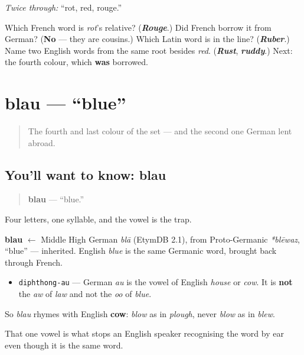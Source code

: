 \emph{Twice through:} \textquotedblleft{}rot, red, rouge.\textquotedblright{}

\begin{tcolorbox}[breakable,colback=teal!4,colframe=teal!35!black,title={Before you move on}]
Which French word is \emph{rot}'s relative? (\emph{\textbf{Rouge}}.) Did French borrow it from German? (\textbf{No} — they are cousins.) Which Latin word is in the line? (\emph{\textbf{Ruber}}.) Name two English words from the same root besides \emph{red}. (\emph{\textbf{Rust}}, \emph{\textbf{ruddy}}.) Next: the fourth colour, which \textbf{was} borrowed.
\end{tcolorbox}
\section[blau]{blau — \textquotedblleft{}blue\textquotedblright{}}

\label{lesson:GE-C13-blau}



\begin{quote}
The fourth and last colour of the set — and the second one German lent abroad.
\end{quote}

\subsection*{You'll want to know: blau}
\begin{quote}
\textbf{blau} — \textquotedblleft{}blue.\textquotedblright{}
\end{quote}

Four letters, one syllable, and the vowel is the trap.

\begin{cousinweb}
\textbf{blau} $\leftarrow$ Middle High German \emph{blā} (EtymDB 2.1), from Proto-Germanic \emph{*blēwaz}, \textquotedblleft{}blue\textquotedblright{} — inherited. English \emph{blue} is the same Germanic word, brought back through French.
\end{cousinweb}

\begin{sounds}
\begin{itemize}
\raggedright
  \item \texttt{diphthong-au} — German \emph{au} is the vowel of English \emph{house} or \emph{cow}. It is \textbf{not} the \emph{aw} of \emph{law} and not the \emph{oo} of \emph{blue}.
\end{itemize}

So \emph{blau} rhymes with English \textbf{cow}: \emph{blow} as in \emph{plough}, never \emph{blow} as in \emph{blew}.

That one vowel is what stops an English speaker recognising the word by ear even though it is the same word.
\end{sounds}

